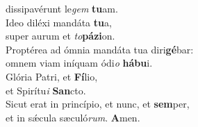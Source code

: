 \evenverse dissipavérunt le\textit{gem} \textbf{tu}am.\\
\oddverse Ideo diléxi mandáta \textbf{tu}a,~\*\\
\oddverse super aurum et \textit{to}\textbf{pá}\textbf{zi}on.\\
\evenverse Proptérea ad ómnia mandáta tua diri\textbf{gé}bar:~\*\\
\evenverse omnem viam iníquam ódi\textit{o} \textbf{há}\textbf{bu}i.\\
\oddverse Glória Patri, et \textbf{Fí}lio,~\*\\
\oddverse et Spirítu\textit{i} \textbf{San}cto.\\
\evenverse Sicut erat in princípio, et nunc, et \textbf{sem}per,~\*\\
\evenverse et in sǽcula sæculó\textit{rum}. \textbf{A}men.\\

